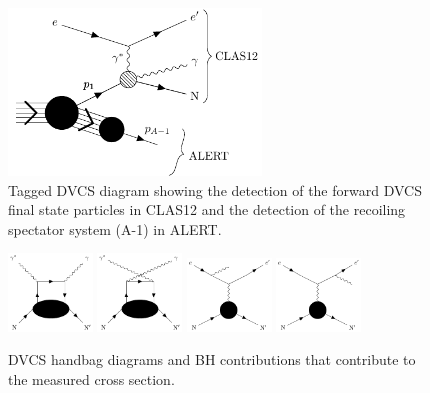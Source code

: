 \begin{figure}
   \centering
   \includegraphics[width=0.60\textwidth]{../tikz/dvcs_feynman/dvcs_feynman-figure0.pdf}
   \caption{\label{fig:taggedDVCS}Tagged DVCS diagram showing the detection of 
   the forward DVCS final state particles in CLAS12 and the detection of the 
recoiling spectator system (A-1) in ALERT.}
\end{figure}

\begin{figure}
   \centering
   \includegraphics[width=0.20\textwidth]{../tikz/dvcs_feynman/dvcs_feynman-figure1.pdf}
   \includegraphics[width=0.20\textwidth]{../tikz/dvcs_feynman/dvcs_feynman-figure2.pdf}
   \includegraphics[width=0.20\textwidth]{../tikz/dvcs_feynman/dvcs_feynman-figure3.pdf}
   \includegraphics[width=0.20\textwidth]{../tikz/dvcs_feynman/dvcs_feynman-figure4.pdf}
   \caption{\label{fig:DVCShandbag}DVCS handbag diagrams and BH contributions 
   that contribute to the measured cross section.}
\end{figure}


